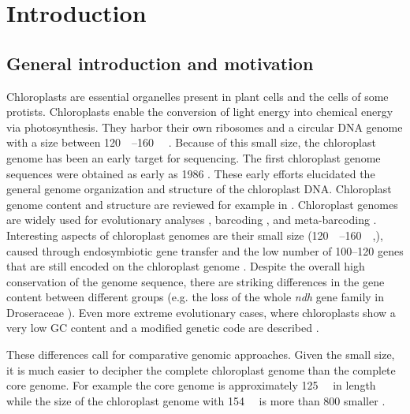 \documentclass{bmcart}
\newcommand{\genename}[1]{\textit{#1}}
\begin{document}

\section*{Introduction}
\subsection*{General introduction and motivation}
Chloroplasts are essential organelles present in plant cells and the cells of some protists.
Chloroplasts enable the conversion of light energy into chemical energy via photosynthesis.
They harbor their own ribosomes and a circular DNA genome with a size between \SIrange{120}{160}{\kilo\basepair} \cite{palmer_1985}.
Because of this small size, the chloroplast genome has been an early target for sequencing.
The first chloroplast genome sequences were obtained as early as 1986 \cite{ohyama_chloroplast_1986,shinozaki_complete_1986}.
These early efforts elucidated the general genome organization and structure of the chloroplast DNA. 
Chloroplast genome content and structure are reviewed for example in \cite{wicke_evolution_2011,green_chloroplast_2011}.
Chloroplast genomes are widely used for evolutionary analyses \cite{martin_plastid_2010,xiao-ming_inferring_2017}, barcoding \cite{kress_use_2005,hollingsworth_dna_2009,de_vere_dna_2015}, and meta-barcoding \cite{bell_review_2016,deiner_environmental_2017}.
Interesting aspects of chloroplast genomes are their small size (\SIrange{120}{160}{\kilo\basepair},\cite{palmer_1985}), caused through endosymbiotic gene transfer \cite{martin_evolutionary_2002,timmis_endosymbiotic_2004} and the low number of \numrange{100}{120} genes that are still encoded on the chloroplast genome \cite{wicke_evolution_2011}.
Despite the overall high conservation of the genome sequence, there are striking differences in the gene content between different groups (e.g. the loss of the whole \genename{ndh} gene family in Droseraceae \cite{nevill_plastome-wide_2019}). Even more extreme evolutionary cases, where chloroplasts show a very low GC content and a modified genetic code are described \cite{su_novel_2019}.

These differences call for comparative genomic approaches.
Given the small size, it is much easier to decipher the complete chloroplast genome than the complete core genome.
For example the  core genome is approximately \SI{125}{\mega\basepair} in length \cite{schmuths2004,cao2011} while the size of the  chloroplast genome with \SI{154}{\kilo\basepair} is more than \SI{800}{\times} smaller \cite{sato1999}.
\end{document}

